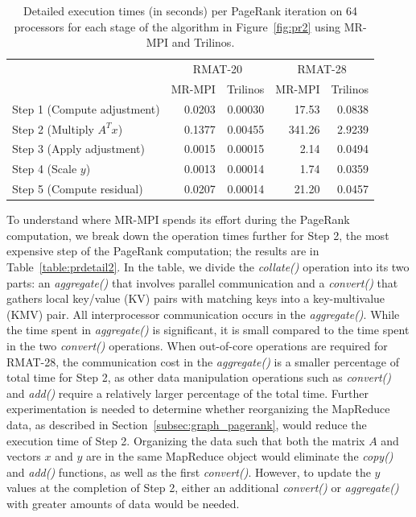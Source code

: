 \begin{table}[htb]
\begin{center}
\begin{tabular}{|l|r|r|r|r|}
\hline 
& \multicolumn{2}{|c|}{RMAT-20} & \multicolumn{2}{|c|}{RMAT-28} \\
& MR-MPI & Trilinos & MR-MPI & Trilinos  \\
\hline
Step 1 (Compute adjustment) & 0.0203 & 0.00030 & 17.53 & 0.0838 \\
Step 2 (Multiply $A^T x$) & 0.1377 & 0.00455 & 341.26 & 2.9239 \\
Step 3 (Apply adjustment) & 0.0015 & 0.00015 & 2.14 & 0.0494 \\
Step 4 (Scale $y$)  & 0.0013 & 0.00014 & 1.74 & 0.0359 \\
Step 5 (Compute residual)  & 0.0207 & 0.00014 & 21.20 & 0.0457 \\
\hline
\end{tabular}
\caption{Detailed execution times (in seconds) per PageRank iteration
on 64 processors
for each stage of the algorithm
in Figure~\ref{fig:pr2} using MR-MPI and Trilinos.}
\label{table:prdetail}
\end{center}
\end{table}


To understand where MR-MPI spends its effort during the PageRank
computation, we break down the operation times further for Step 2, the most
expensive step of the PageRank computation; the results are in
Table~\ref{table:prdetail2}.  In the table, we divide the {\it
collate()} operation into its two parts: an {\it aggregate()} that
involves parallel communication and a {\it convert()} that gathers
local key/value (KV) pairs with matching keys into a key-multivalue
(KMV) pair.  All interprocessor communication occurs in the {\it
aggregate()}.  While the time spent in {\it aggregate()} is
significant, it is small compared to the time spent in the two {\it
convert()} operations.  When out-of-core operations are required for
RMAT-28, the communication cost in the {\it aggregate()} is a smaller
percentage of total time for Step 2, as other data manipulation
operations such as {\it convert()} and {\it add()} require a
relatively larger percentage of the total time.  Further
experimentation is needed to determine whether reorganizing the
MapReduce data, as described in Section~\ref{subsec:graph_pagerank},
would reduce the execution time of Step 2.  Organizing the data such
that both the matrix $A$ and vectors $x$ and $y$ are in the same
MapReduce object would eliminate the {\it copy()} and {\it add()}
functions, as well as the first {\it convert()}.  However, to update
the $y$ values at the completion of Step 2, either an additional {\it
convert()} or {\it aggregate()} with greater amounts of data would be
needed.

